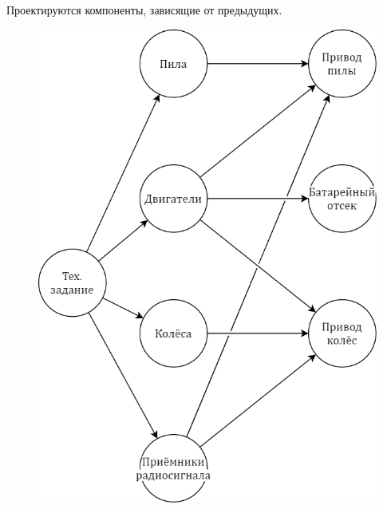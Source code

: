 \begin{frame} 
  Проектируются компоненты, зависящие от предыдущих.
  \begin{figure}[!ht]
    \centering
    \includegraphics[scale=0.2]{images/design.frame03.png}
    \label{fig:desginFrame03}
  \end{figure}
\end{frame}
